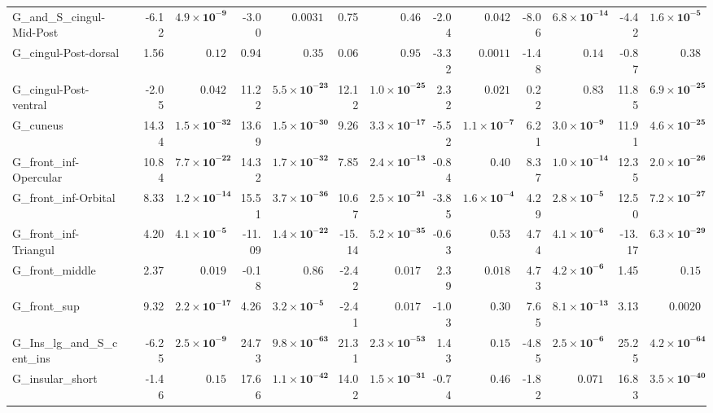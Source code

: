 {\begin{longtable}{llrrrrrrrrrrrr}
G\_and\_S\_cingul-Mid-Post &  & -6.12 & $\mathbf{4.9{\times}10^{-9}}$ & -3.00 & $0.0031$ & 0.75 & $0.46$ & -2.04 & $0.042$ & -8.06 & $\mathbf{6.8{\times}10^{-14}}$ & -4.42 & $\mathbf{1.6{\times}10^{-5}}$ \\
G\_cingul-Post-dorsal &  & 1.56 & $0.12$ & 0.94 & $0.35$ & 0.06 & $0.95$ & -3.32 & $0.0011$ & -1.48 & $0.14$ & -0.87 & $0.38$ \\
G\_cingul-Post-ventral &  & -2.05 & $0.042$ & 11.22 & $\mathbf{5.5{\times}10^{-23}}$ & 12.12 & $\mathbf{1.0{\times}10^{-25}}$ & 2.32 & $0.021$ & 0.22 & $0.83$ & 11.85 & $\mathbf{6.9{\times}10^{-25}}$ \\
G\_cuneus &  & 14.34 & $\mathbf{1.5{\times}10^{-32}}$ & 13.69 & $\mathbf{1.5{\times}10^{-30}}$ & 9.26 & $\mathbf{3.3{\times}10^{-17}}$ & -5.52 & $\mathbf{1.1{\times}10^{-7}}$ & 6.21 & $\mathbf{3.0{\times}10^{-9}}$ & 11.91 & $\mathbf{4.6{\times}10^{-25}}$ \\
G\_front\_inf-Opercular &  & 10.84 & $\mathbf{7.7{\times}10^{-22}}$ & 14.32 & $\mathbf{1.7{\times}10^{-32}}$ & 7.85 & $\mathbf{2.4{\times}10^{-13}}$ & -0.84 & $0.40$ & 8.37 & $\mathbf{1.0{\times}10^{-14}}$ & 12.35 & $\mathbf{2.0{\times}10^{-26}}$ \\
G\_front\_inf-Orbital &  & 8.33 & $\mathbf{1.2{\times}10^{-14}}$ & 15.51 & $\mathbf{3.7{\times}10^{-36}}$ & 10.67 & $\mathbf{2.5{\times}10^{-21}}$ & -3.85 & $\mathbf{1.6{\times}10^{-4}}$ & 4.29 & $\mathbf{2.8{\times}10^{-5}}$ & 12.50 & $\mathbf{7.2{\times}10^{-27}}$ \\
G\_front\_inf-Triangul &  & 4.20 & $\mathbf{4.1{\times}10^{-5}}$ & -11.09 & $\mathbf{1.4{\times}10^{-22}}$ & -15.14 & $\mathbf{5.2{\times}10^{-35}}$ & -0.63 & $0.53$ & 4.74 & $\mathbf{4.1{\times}10^{-6}}$ & -13.17 & $\mathbf{6.3{\times}10^{-29}}$ \\
G\_front\_middle &  & 2.37 & $0.019$ & -0.18 & $0.86$ & -2.42 & $0.017$ & 2.39 & $0.018$ & 4.73 & $\mathbf{4.2{\times}10^{-6}}$ & 1.45 & $0.15$ \\
G\_front\_sup &  & 9.32 & $\mathbf{2.2{\times}10^{-17}}$ & 4.26 & $\mathbf{3.2{\times}10^{-5}}$ & -2.41 & $0.017$ & -1.03 & $0.30$ & 7.65 & $\mathbf{8.1{\times}10^{-13}}$ & 3.13 & $0.0020$ \\
G\_Ins\_lg\_and\_S\_cent\_ins &  & -6.25 & $\mathbf{2.5{\times}10^{-9}}$ & 24.73 & $\mathbf{9.8{\times}10^{-63}}$ & 21.31 & $\mathbf{2.3{\times}10^{-53}}$ & 1.43 & $0.15$ & -4.85 & $\mathbf{2.5{\times}10^{-6}}$ & 25.25 & $\mathbf{4.2{\times}10^{-64}}$ \\
G\_insular\_short &  & -1.46 & $0.15$ & 17.66 & $\mathbf{1.1{\times}10^{-42}}$ & 14.02 & $\mathbf{1.5{\times}10^{-31}}$ & -0.74 & $0.46$ & -1.82 & $0.071$ & 16.83 & $\mathbf{3.5{\times}10^{-40}}$ \\

\end{longtable}}
